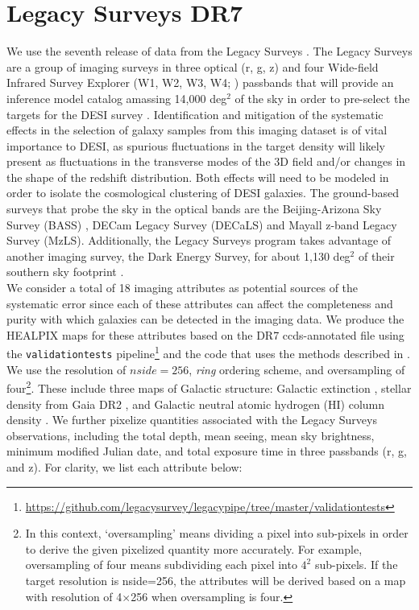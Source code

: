 \documentclass[fleqn, usenatbib]{mnras}
\begin{document}
\section{Legacy Surveys DR7}\label{sec:data}
We use the seventh release of data from the Legacy Surveys \citep{dey2018overview}. The Legacy Surveys are a group of imaging surveys in three optical (r, g, z) and four Wide-field Infrared Survey Explorer (W1, W2, W3, W4; \citet{wright2010wide}) passbands that will provide an inference model catalog amassing 14,000 deg$^{2}$ of the sky in order to pre-select the targets for the DESI survey \citep{lang2016tractor, aghamousa2016desi}. Identification and mitigation of the systematic effects in the selection of galaxy samples from  this imaging dataset is of vital importance to DESI, as spurious fluctuations in the target density will likely present as fluctuations in the transverse modes of the 3D field and/or changes in the shape of the redshift distribution. Both effects will need to be modeled in order to isolate the cosmological clustering of DESI galaxies. The ground-based surveys that probe the sky in the optical bands are the Beijing-Arizona Sky Survey (BASS) \citep{zou2017project}, DECam Legacy Survey (DECaLS) and Mayall z-band Legacy Survey (MzLS)\citep[see e.g.,][]{dey2018overview}. Additionally, the Legacy Surveys program takes advantage of another imaging survey, the Dark Energy Survey, for about 1,130 deg$^{2}$ of their southern sky footprint \citep{dark2005dark}. \\

We consider a total of 18 imaging attributes as potential sources of the systematic error since each of these attributes can affect the completeness and purity with which galaxies can be detected in the imaging data. We produce the HEALPIX maps \citep{gorski2005healpix} for these attributes based on the DR7 ccds-annotated file using the \texttt{validationtests} pipeline\footnote{\url{https://github.com/legacysurvey/legacypipe/tree/master/validationtests}} and the code that uses the methods described in \citet{LeistedtMap}. We use the resolution of $nside=256$, \textit{ring} ordering scheme, and oversampling of four\footnote{In this context, `oversampling' means dividing a pixel into sub-pixels in order to derive the given pixelized quantity more accurately. For example, oversampling of four means subdividing each pixel into $4^2$ sub-pixels. If the target resolution is nside=256, the attributes will be derived based on a map with resolution of 4$\times$256 when oversampling is four.}. These include three maps of Galactic structure: Galactic extinction \citep{schlegel1998maps}, stellar density from Gaia DR2 \citep{brown2018gaia}, and Galactic neutral atomic hydrogen (HI) column density \citep{bekhti2016hi4pi}. We further pixelize quantities associated with the Legacy Surveys observations, including the total depth, mean seeing, mean sky brightness, minimum modified Julian date, and total exposure time in three passbands (r, g, and z).  For clarity, we list each attribute below:\\
\end{document}
